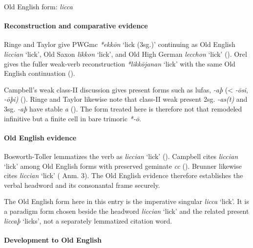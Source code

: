 \documentclass[
  british,
  a4paper,
]{article}
\providecommand{\Recon}[1]{\emph{*#1}}
\begin{document}
Old English form: \emph{licca}

\paragraph{Reconstruction and comparative
evidence}\label{reconstruction-and-comparative-evidence-140}

Ringe and Taylor give PWGmc \Recon{ekkōn} `lick (3sg.)' continuing as
Old English {\emph{liccian}} `lick', Old Saxon {\emph{likkon}} `lick',
and Old High German {\emph{lecchon}} `lick'
(). Orel gives
the fuller weak-verb reconstruction \Recon{likkōjanan} `lick' with the
same Old English continuation ().

Campbell's weak class-II discussion gives present forms such as lufas,
\emph{-aþ} (\textless{} \emph{-ōsi}, \emph{-ōþi)}
(). Ringe and
Taylor likewise note that class-II weak present 2sg. \emph{-as(t)} and
3sg. \emph{-aþ} have stable \emph{a}
(). The form
treated here is therefore not that remodeled infinitive but a finite
cell in bare trimoric \emph{*-ō}.

\paragraph{Old English evidence}\label{old-english-evidence-140}

Bosworth-Toller lemmatizes the verb as \emph{liccian} `lick'
().
Campbell cites \emph{liccian} `lick' among Old English forms with
preserved geminate \emph{cc} (). Brunner likewise cites \emph{liccian} `lick'
( Anm. 3). The
Old English evidence therefore establishes the verbal headword and its
consonantal frame securely.

The Old English form here in this entry is the imperative singular
{\emph{licca}} `lick'. It is a paradigm form chosen beside the headword
{\emph{liccian}} `lick' and the related present {\emph{liccaþ}} `licks',
not a separately lemmatized citation word.

\paragraph{Development to Old
English}\label{development-to-old-english-140}
\end{document}
